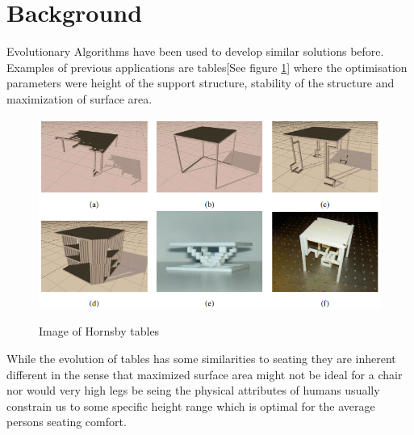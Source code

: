 \section{Background}
Evolutionary Algorithms have been used to develop similar solutions before. Examples of previous  applications are tables[See figure \ref{fig:hornby_tables}] where the optimisation parameters were height of the support structure, stability of the structure and maximization of surface area.
\begin{figure}[ht]
\includegraphics[scale=.6]{content/img/tables}
\label{fig:hornby_tables}\\
\caption{Image of Hornsby tables\cite{paper:ev4} }
\end{figure}

While the evolution of tables has some similarities to seating they are inherent different in the sense that maximized surface area might not be ideal for a chair nor would very high legs be seing the physical attributes of humans usually constrain us to some specific height range which is optimal for the average persons seating comfort.
